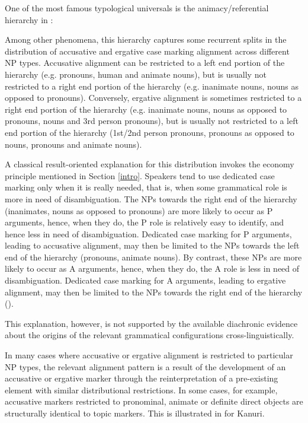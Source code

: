 \documentclass[output=paper]{langsci/langscibook}
\begin{document}
One of the most famous typological universals is the animacy/referential hierarchy in :



Among other phenomena, this hierarchy captures some recurrent splits
in the distribution of
accusative and ergative case marking alignment
 across different NP types.
 Accusative alignment
  can be restricted to a left end portion of the hierarchy (e.g.  pronouns, human and animate
nouns), but is usually not restricted to a right end portion of the hierarchy (e.g. inanimate nouns, nouns as opposed to
pronouns). Conversely, ergative alignment  is sometimes restricted to a right end portion of the hierarchy (e.g. inanimate
nouns, nouns as opposed to pronouns, nouns and 3rd person pronouns), but is usually not restricted to a left end portion of the hierarchy
(1st/2nd person pronouns, pronouns as opposed to nouns, pronouns and animate nouns).

A classical result-oriented explanation  for this distribution invokes the economy
principle mentioned in Section \ref{intro}. Speakers  tend to use dedicated case marking  only when
it is really needed, that is, when some grammatical role is more in
need of disambiguation. The NPs towards the right end of the
hierarchy (inanimates, nouns as opposed to pronouns) are more likely
to occur as P arguments, hence, when they do, the P role is relatively
easy to identify, and hence less in need of disambiguation. Dedicated
case marking for P arguments, leading to accusative alignment, may
then be limited to the NPs towards the left end of the hierarchy
(pronouns, animate nouns). By contrast, these NPs are more likely to
occur as A arguments, hence, when they do, the A role is less in need
of disambiguation. Dedicated case marking for A arguments, leading to
ergative alignment, may then be limited to the NPs towards the right
end of the hierarchy
 (\citealt{Silverstein1976,Dixon1979_Erg,Dixon1994_Erg,Comrie1981_Typ,DeLancey1981,Song2001,TU2}). 

This explanation, however, is not  supported by the available
diachronic evidence about the origins of the relevant grammatical configurations
cross-linguistically. 

In many cases where accusative or ergative alignment is restricted to
particular NP types, the relevant alignment pattern is a result of the
development of an accusative or ergative
marker through the reinterpretation of a pre-existing
element with similar distributional restrictions.  In some cases, for example, accusative markers restricted
to pronominal, animate or  definite direct objects are 
structurally identical to topic markers. This is illustrated  in
 for Kanuri. 
\end{document}
